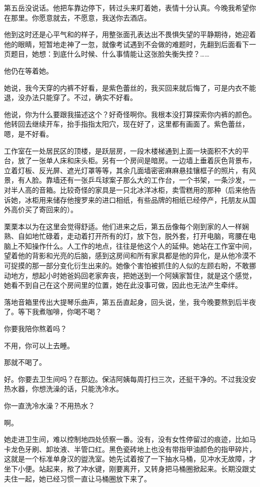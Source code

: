\documentclass[lang=cn,newtx,12pt,scheme=chinese]{elegantbook}
\begin{document}
第五岳没说话。他把车靠边停下，转过头来盯着她，表情十分认真。今晚我希望你在那里。你愿意就去，不愿意，我送你去酒店。

他到这时还是心平气和的样子，用整张面孔表达出不畏惧失望的平静期待，她迎着他的眼睛，短暂地走神了一忽，就像考试遇到不会做的难题时，先翻到后面看下一页题目，她想：到底什么时候、什么事情能让这张脸失衡失控？……

他仍在等着她。

她说，我今天穿的内裤不好看，是紫色蕾丝的，我买回来就后悔了，可是内衣不能退，没办法只能穿了。不过，确实不好看。

他说，你为什么要跟我描述这个？好奇怪啊你。我根本没打算探索你内裤的颜色。他转回去继续开车，抬手指指太阳穴，现在好了，这里都有画面了。紫色蕾丝，嗯，是不好看。

工作室在一处居民区的顶楼，是跃层房，一段木楼梯通到上面一块面积不大的平台，放了一张单人床和床头柜。另有一个房间是暗房。一边墙上垂着灰色背景布，立着灯板、反光屏、遮光灯罩等等，其余几面墙密密麻麻悬挂镶框子的照片，有风景，有人脸。靠墙还有一张乒乓球案子那么大的工作台，一个书架，一条沙发，一对半人高的音箱。比较奇怪的家具是一只北冰洋冰柜，卖雪糕用的那种（后来他告诉她，冰柜用来储存他搜罗来的进口相纸，有些品牌的相纸已经停产，托朋友从国外高价买了寄回来的）。

栗栗本以为在这里会觉得舒适。他们进来之后，第五岳像每个刚到家的人一样娴熟、自如地忙碌着，走动着打开所有的灯，放下包，脱外套，打开电脑，弯腰在电脑上不知操作什么。人工作的地点，往往是他这个人的延伸。她站在工作室中间，望着他的背影和光亮的后脑，感到这房间和所有家具都是他的异化，是从他冷漠不可捉摸的那一部分变化衍生出来的。她像个害怕被抓住的人似的左顾右盼，不敢挪动地方，想起小时她爸妈回老家奔丧，把她送到一个阿姨家暂住，就是这个感觉，她看不到自己在这个房间里的位置，她在此没事可做，因此也无法产生牵绊。

落地音箱里传出大提琴乐曲声，第五岳直起身，回头说，坐，我今晚要熬到后半夜了。等下我煮咖啡，你喝不喝？

你要我陪你熬着吗？

不用，你可以上去睡。

那就不喝了。

好。你要去卫生间吗？在那边。保洁阿姨每周打扫三次，还挺干净的。不过我没安热水器，你想洗澡的话，只能洗冷水。

你一直洗冷水澡？不用热水？

啊。

她走进卫生间，难以控制地四处侦察一番。没有，没有女性停留过的痕迹，比如马卡龙色牙刷、卸妆液、半管口红。黑色瓷砖地上也没有带指甲油颜色的指甲碎片，这就是一个标准单身汉的盥洗室。她先试着按了一下抽水马桶，见冲水无故障，才坐下小便。站起来，揿了冲水键，刚要离开，又转身把马桶圈掀起来。长期没跟丈夫住一起，她已经习惯一直让马桶圈放下来了。
\end{document}
